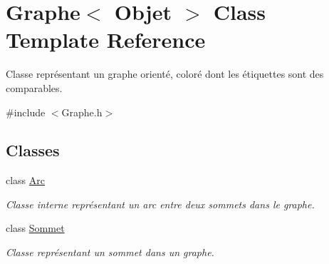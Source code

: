 \hypertarget{class_graphe}{
\section{Graphe$<$ Objet $>$ Class Template Reference}
\label{class_graphe}
}


Classe représentant un graphe orienté, coloré dont les étiquettes sont des comparables.  




{\ttfamily \#include $<$Graphe.h$>$}

\subsection*{Classes}
\begin{DoxyCompactItemize}
\item 
class \hyperlink{class_graphe_1_1_arc}{Arc}
\begin{DoxyCompactList}\small\item\em Classe interne représentant un arc entre deux sommets dans le graphe. \end{DoxyCompactList}\item 
class \hyperlink{class_graphe_1_1_sommet}{Sommet}
\begin{DoxyCompactList}\small\item\em Classe représentant un sommet dans un graphe. \end{DoxyCompactList}\end{DoxyCompactItemize}
